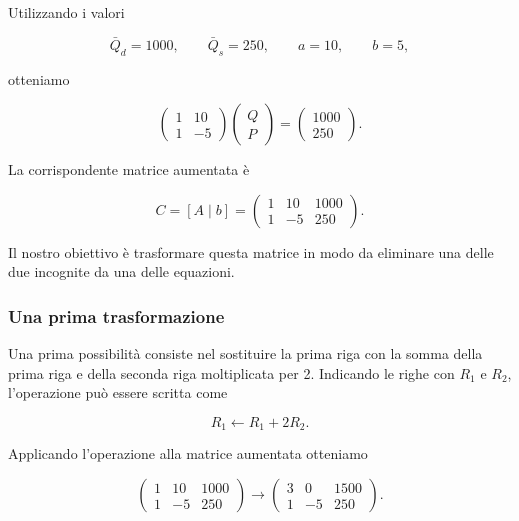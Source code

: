 Utilizzando i valori

\begin{equation*}
    \bar Q_d=1000,
    \qquad
    \bar Q_s=250,
    \qquad
    a=10,
    \qquad
    b=5,
\end{equation*}

otteniamo

\begin{equation*}
    \begin{pmatrix}
        1 & 10\\
        1 & -5
    \end{pmatrix}
    \begin{pmatrix}
        Q\\
        P
    \end{pmatrix}
    =
    \begin{pmatrix}
        1000\\
        250
    \end{pmatrix}.
    \label{eq:sistema-domanda-offerta-gauss}
\end{equation*}

La corrispondente matrice aumentata è

\begin{equation*}
    C=[A\mid b]
    =
    \left(
    \begin{array}{cc|c}
        1 & 10 & 1000\\
        1 & -5 & 250
    \end{array}
    \right).
    \label{eq:matrice-aumentata-domanda-offerta}
\end{equation*}

Il nostro obiettivo è trasformare questa matrice in modo da
eliminare una delle due incognite da una delle equazioni.


\subsubsection{Una prima trasformazione}

Una prima possibilità consiste nel sostituire la prima riga con la
somma della prima riga e della seconda riga moltiplicata per 2. Indicando le
righe con $R_1$ e $R_2$, l'operazione può essere scritta come

\begin{equation*}
    R_1 \leftarrow R_1+2R_2.
\end{equation*}

Applicando l'operazione alla matrice aumentata otteniamo

\begin{equation*}
    \left(
    \begin{array}{cc|c}
        1 & 10 & 1000\\
        1 & -5 & 250
    \end{array}
    \right)
    \longrightarrow
    \left(
    \begin{array}{cc|c}
        3 & 0 & 1500\\
        1 & -5 & 250
    \end{array}
    \right).
\end{equation*}

